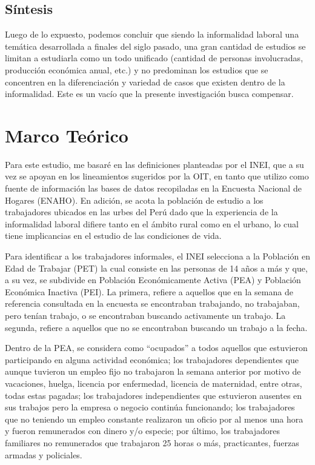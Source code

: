 \documentclass[
  letterpaper,
  12pt,
  oneside,
  spanish,
  doublespacing,
  headsepline,
  parskip]{MastersDoctoralThesis}
\begin{document}
\hypertarget{suxedntesis}{%
\section{Síntesis}\label{suxedntesis}}

Luego de lo expuesto, podemos concluir que siendo la informalidad
laboral una temática desarrollada a finales del siglo pasado, una gran
cantidad de estudios se limitan a estudiarla como un todo unificado
(cantidad de personas involucradas, producción económica anual, etc.) y
no predominan los estudios que se concentren en la diferenciación y
variedad de casos que existen dentro de la informalidad. Este es un
vacío que la presente investigación busca compensar.


\hypertarget{sec-marco}{%
\chapter{Marco Teórico}\label{sec-marco}}

Para este estudio, me basaré en las definiciones planteadas por el INEI,
que a su vez se apoyan en los lineamientos sugeridos por la OIT, en
tanto que utilizo como fuente de información las bases de datos
recopiladas en la Encuesta Nacional de Hogares (ENAHO). En adición, se
acota la población de estudio a los trabajadores ubicados en las urbes
del Perú dado que la experiencia de la informalidad laboral difiere
tanto en el ámbito rural como en el urbano, lo cual tiene implicancias
en el estudio de las condiciones de vida.

Para identificar a los trabajadores informales, el INEI selecciona a la
Población en Edad de Trabajar (PET) la cual consiste en las personas de
14 años a más y que, a su vez, se subdivide en Población Económicamente
Activa (PEA) y Población Económica Inactiva (PEI). La primera, refiere a
aquellos que en la semana de referencia consultada en la encuesta se
encontraban trabajando, no trabajaban, pero tenían trabajo, o se
encontraban buscando activamente un trabajo. La segunda, refiere a
aquellos que no se encontraban buscando un trabajo a la fecha.

Dentro de la PEA, se considera como ``ocupados'' a todos aquellos que
estuvieron participando en alguna actividad económica; los trabajadores
dependientes que aunque tuvieron un empleo fijo no trabajaron la semana
anterior por motivo de vacaciones, huelga, licencia por enfermedad,
licencia de maternidad, entre otras, todas estas pagadas; los
trabajadores independientes que estuvieron ausentes en sus trabajos pero
la empresa o negocio continúa funcionando; los trabajadores que no
teniendo un empleo constante realizaron un oficio por al menos una hora
y fueron remunerados con dinero y/o especie; por último, los
trabajadores familiares no remunerados que trabajaron 25 horas o más,
practicantes, fuerzas armadas y policiales.
\end{document}
